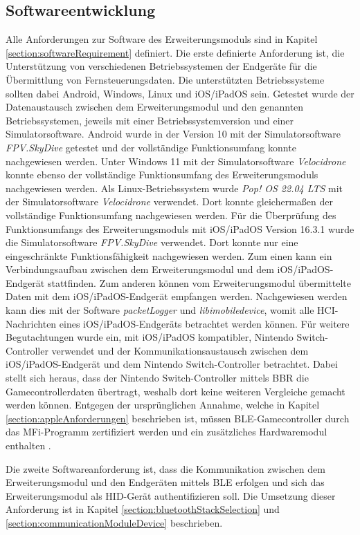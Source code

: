 \subsection{Softwareentwicklung}
Alle Anforderungen zur Software des Erweiterungsmoduls sind in Kapitel \ref{section:softwareRequirement} definiert. Die erste definierte Anforderung ist, die Unterstützung von verschiedenen Betriebssystemen der Endgeräte für die Übermittlung von Fernsteuerungsdaten. Die unterstützten Betriebssysteme sollten dabei Android, Windows, Linux und iOS/iPadOS sein. Getestet wurde der Datenaustausch zwischen dem Erweiterungsmodul und den genannten Betriebssystemen, jeweils mit einer Betriebssystemversion und einer Simulatorsoftware. Android wurde in der Version 10 mit der Simulatorsoftware \textit{FPV.SkyDive} getestet und der vollständige Funktionsumfang konnte nachgewiesen werden. Unter Windows 11 mit der Simulatorsoftware \textit{Velocidrone} konnte ebenso der vollständige Funktionsumfang des Erweiterungsmoduls nachgewiesen werden. Als Linux-Betriebssystem wurde \textit{Pop! OS 22.04 LTS} mit der Simulatorsoftware \textit{Velocidrone} verwendet. Dort konnte gleichermaßen der vollständige Funktionsumfang nachgewiesen werden. Für die Überprüfung des Funktionsumfangs des Erweiterungsmoduls mit iOS/iPadOS  Version 16.3.1 wurde die Simulatorsoftware \textit{FPV.SkyDive} verwendet. Dort konnte nur eine eingeschränkte Funktionsfähigkeit nachgewiesen werden. Zum einen kann ein Verbindungsaufbau zwischen dem Erweiterungsmodul und dem iOS/iPadOS-Endgerät stattfinden. Zum anderen können vom Erweiterungsmodul übermittelte Daten mit dem iOS/iPadOS-Endgerät empfangen werden. Nachgewiesen werden kann dies mit der Software \textit{packetLogger} und \textit{libimobiledevice}, womit alle \ac{HCI}-Nachrichten eines iOS/iPadOS-Endgeräts betrachtet werden können. Für weitere Begutachtungen wurde ein, mit iOS/iPadOS kompatibler, Nintendo Switch-Controller verwendet und der Kommunikationsaustausch zwischen dem iOS/iPadOS-Endgerät und dem Nintendo Switch-Controller betrachtet. Dabei stellt sich heraus, dass der Nintendo Switch-Controller mittels \ac{BBR} die Gamecontrollerdaten übertragt, weshalb dort keine weiteren Vergleiche gemacht werden können. Entgegen der ursprünglichen Annahme, welche in Kapitel \ref{section:appleAnforderungen} beschrieben ist, müssen \ac{BLE}-Gamecontroller durch das \ac{MFi}-Programm zertifiziert werden und ein zusätzliches Hardwaremodul enthalten \cite{lemmingDevESP32Comment}.

Die zweite Softwareanforderung ist, dass die Kommunikation zwischen dem Erweiterungsmodul und den Endgeräten mittels \ac{BLE} erfolgen und sich das Erweiterungsmodul als \ac{HID}-Gerät authentifizieren soll. Die Umsetzung dieser Anforderung ist in Kapitel \ref{section:bluetoothStackSelection} und \ref{section:communicationModuleDevice} beschrieben.

